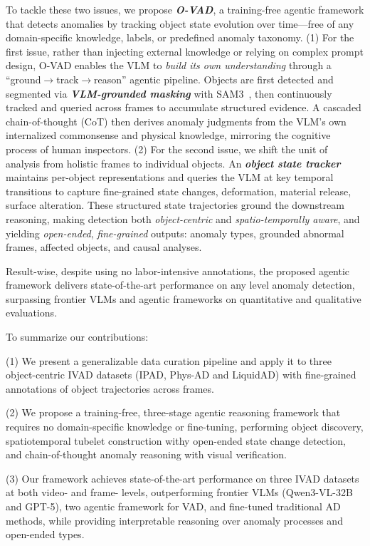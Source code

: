 \documentclass[runningheads]{llncs}
\begin{document}
To tackle these two issues, we propose \textbf{\textit{O-VAD}}, a training-free agentic framework that detects anomalies by tracking object state evolution over time---free of any domain-specific knowledge, labels, or predefined anomaly taxonomy.
(1) For the first issue, rather than injecting external knowledge or relying on complex prompt design, O-VAD enables the VLM to \emph{build its own understanding} through a ``ground$\rightarrow$track$\rightarrow$reason'' agentic pipeline. Objects are first detected and segmented via \textbf{\textit{VLM-grounded masking}} with SAM3~\cite{carion2025sam}, then continuously tracked and queried across frames to accumulate structured evidence. A cascaded chain-of-thought (CoT)
then derives anomaly judgments from the VLM's own internalized commonsense and physical knowledge, mirroring the cognitive process of human inspectors.
(2) For the second issue, we shift the unit of analysis from holistic frames to individual objects. An \textbf{\emph{object state tracker}} maintains per-object representations and queries the VLM at key temporal transitions to capture fine-grained state changes, \eg deformation, material release, surface alteration. These structured state trajectories ground the downstream reasoning, making detection both \emph{object-centric} and \emph{spatio-temporally aware}, and yielding \emph{open-ended}, \emph{fine-grained} outputs: anomaly types, grounded abnormal frames, affected objects, and causal analyses.
%
%

Result-wise, despite using no labor-intensive annotations, the proposed agentic framework delivers state-of-the-art performance on any level anomaly detection, surpassing frontier VLMs and agentic frameworks on quantitative and qualitative evaluations. 

To summarize our contributions:

(1) We present a generalizable data curation pipeline and apply it to three object-centric IVAD datasets (IPAD, Phys-AD and LiquidAD) with fine-grained annotations of object trajectories across frames.

(2) We propose a training-free, three-stage agentic reasoning framework that requires no domain-specific knowledge or fine-tuning, performing object discovery, spatiotemporal tubelet construction withy open-ended state change detection, and chain-of-thought anomaly reasoning with visual verification.

(3) Our framework achieves state-of-the-art performance on three IVAD datasets at both video- and frame- levels, outperforming frontier VLMs (Qwen3-VL-32B and GPT-5), two agentic framework for VAD, and fine-tuned traditional AD methods, while providing interpretable reasoning over anomaly processes and open-ended types.    
\end{document}
